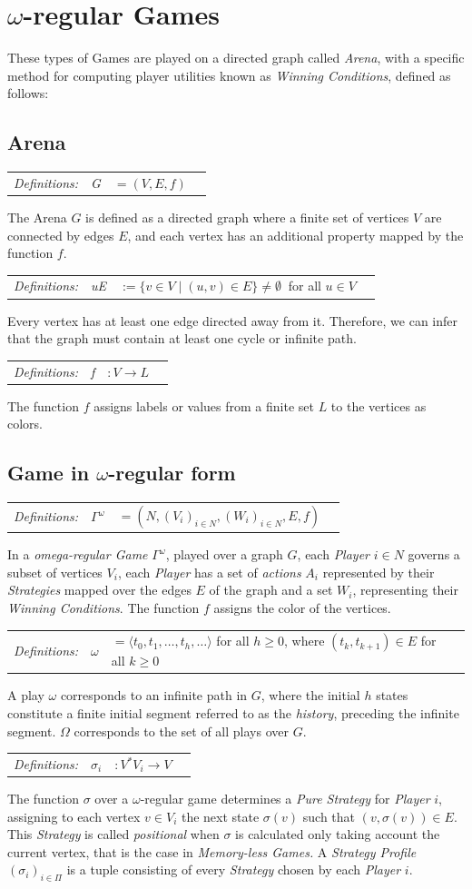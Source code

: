 \documentclass[12pt]{extarticle}
\newcommand{\definition}[1] {
    \begin{tcolorbox}[colback=mygray,colframe=mygray,sharp corners=all,top=0.01cm,bottom=0.01cm,left=0.1cm]
    \small
    \setlength{\tabcolsep}{2pt}
    \begin{tabular}{l l l l}
        \textit{Definitions:} & #1
    \end{tabular}
    \end{tcolorbox}
}
\begin{document}
\section{$\omega$-regular Games}

These types of Games are played on a directed graph called \textit{Arena}, with a specific method for computing player utilities known as \textit{Winning Conditions}, defined as follows:

\subsection{Arena}
\definition{\textit{G} &$ =(V,E,f)$} 
The Arena  $G$ is defined as a directed graph where a finite set of vertices $V$ are connected by edges $E$, and each vertex has an additional property mapped by the function $f$.

\definition{\textit{uE} &$ :=\{v \in V \mid (u,v) \in E \} \neq \emptyset\ $ for all $u \in V$}
Every vertex has at least one edge directed away from it. Therefore, we can infer that the graph must contain at least one cycle or infinite path.

\definition{\textit{f} &$ :V \rightarrow L$}
The function $f$ assigns labels or values from a finite set $L$ to the vertices as colors.

\subsection{Game in $\omega$-regular form}

\definition{$\Gamma^\omega$ &$ =(N,(V_i)_{i \in N},(W_i)_{i \in N},E,f)$}
In a \textit{omega-regular Game} $\Gamma^\omega$, played over a graph $G$, each \textit{Player} $i \in N$ governs a subset of vertices $V_i$, each \textit{Player} has a set of \textit{actions} $A_i$ represented by their \textit{Strategies} mapped over the edges $E$ of the graph and a set $W_i$, representing their \textit{Winning Conditions}.  The function $f$ assigns the color of the vertices.

\definition{
    $\omega$ &$ = \langle t_0,t_1,\ldots,t_h,\ldots \rangle$ for all $h \geqslant 0$, where $(t_k,t_{k+1}) \in E$ for all $k \geqslant 0$
}
A play $\omega$ corresponds to an infinite path in $G$, where the initial $h$ states constitute a finite initial segment referred to as the \textit{history}, preceding the infinite segment.  $\Omega$ corresponds to the set of all plays over $G$. 

\definition{$\sigma_i $&$ :V^*V_i \rightarrow V$}
The function $\sigma$ over a $\omega$-regular game determines a \textit{Pure Strategy} for \textit{Player} $i$, assigning to each vertex $v \in V_i$ the next state $\sigma(v)$ such that $(v, \sigma(v)) \in E$.  This \textit{Strategy} is called \textit{positional} when $\sigma$ is calculated only taking account the current vertex, that is the case in \textit{Memory-less Games.} A \textit{Strategy Profile} $(\sigma_i)_{i \in \Pi}$ is a tuple consisting of every \textit{Strategy} chosen by each \textit{Player} $i$.
\end{document}
